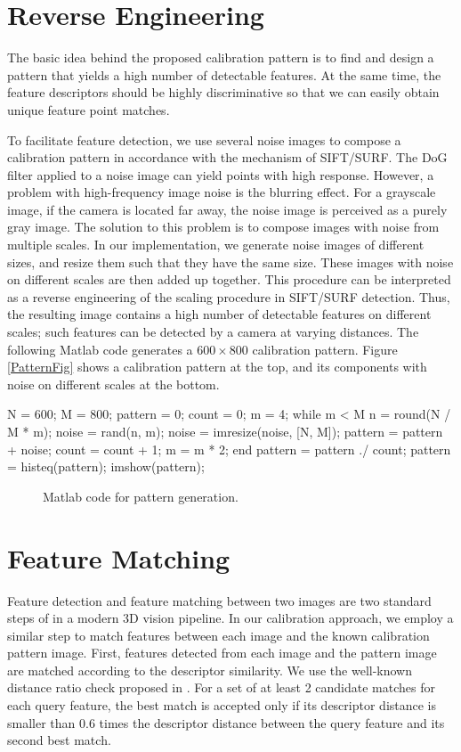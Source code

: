 \documentclass{report}
\begin{document}
\section{Reverse Engineering}
The basic idea behind the proposed calibration pattern is to find and design a pattern that yields a high number of detectable features. At the same time, the feature descriptors should be highly discriminative so that we can easily obtain unique feature point matches. 

To facilitate feature detection, we use several noise images to compose a calibration pattern in accordance with the mechanism of SIFT/SURF. The DoG filter applied to a noise image can yield points with high response. However, a problem with high-frequency image noise is the blurring effect. For a grayscale image, if the camera is located far away, the noise image is perceived as a purely gray image. The solution to this problem is to compose images with noise from multiple scales. In our implementation, we generate noise images of different sizes, and resize them such that they have the same size. These images with noise on different scales are then added up together. This procedure can be interpreted as a reverse engineering of the scaling procedure in SIFT/SURF detection. Thus, the resulting image contains a high number of detectable features on different scales; such features can be detected by a camera at varying distances. The following Matlab code generates a $600 \times 800$ calibration pattern. Figure \ref{PatternFig} shows a calibration pattern at the top, and its components with noise on different scales at the bottom. 

\small
\begin{verbbox}
N = 600; M = 800;
pattern = 0; count = 0;
m = 4;
while m < M
  n = round(N / M * m);
  noise = rand(n, m);
  noise = imresize(noise, [N, M]);
  pattern = pattern + noise;
  count = count + 1;
  m = m * 2;
end
pattern = pattern ./ count;
pattern = histeq(pattern);
imshow(pattern);
\end{verbbox}
\normalsize

\begin{figure}
  \centering
  \theverbbox
  \caption{Matlab code for pattern generation.}
\end{figure}


\section{Feature Matching}
Feature detection and feature matching between two images are two standard steps of in a modern 3D vision pipeline. In our calibration approach, we employ a similar step to match features between each image and the known calibration pattern image. First, features detected from each image and the pattern image are matched according to the descriptor similarity. We use the well-known distance ratio check proposed in \cite{lowe2004distinctive}. For a set of at least 2 candidate matches for each query feature, the best match is accepted only if its descriptor distance is smaller than 0.6 times the descriptor distance between the query feature and its second best match. 
\end{document}

